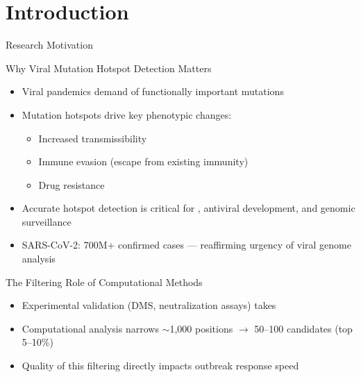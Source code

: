 \section{Introduction}

\begin{frame}{Research Motivation}
  \begin{block}{Why Viral Mutation Hotspot Detection Matters}
    \begin{itemize}
      \item Viral pandemics demand  of functionally important mutations
      \item Mutation hotspots drive key phenotypic changes:
        \begin{itemize}
          \item Increased transmissibility
          \item Immune evasion (escape from existing immunity)
          \item Drug resistance
        \end{itemize}
      \item Accurate hotspot detection is critical for , antiviral development, and genomic surveillance
      \item SARS-CoV-2: 700M+ confirmed cases --- reaffirming urgency of viral genome analysis
    \end{itemize}
  \end{block}
  \vspace{0.3em}
  \begin{block}{The Filtering Role of Computational Methods}
    \begin{itemize}
      \item Experimental validation (DMS, neutralization assays) takes 
      \item Computational analysis narrows $\sim$1,000 positions $\rightarrow$ 50--100 candidates (top 5--10\%)
      \item Quality of this filtering directly impacts outbreak response speed
    \end{itemize}
  \end{block}
\end{frame}

